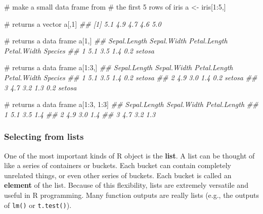 \documentclass[
  13,
  letterpaper,
]{report}
\newenvironment{Shaded}{\begin{snugshade}}{\end{snugshade}}
\newcommand{\CommentTok}[1]{\textcolor[rgb]{0.37,0.37,0.37}{#1}}
\newcommand{\DecValTok}[1]{\textcolor[rgb]{0.68,0.00,0.00}{#1}}
\newcommand{\DocumentationTok}[1]{\textcolor[rgb]{0.37,0.37,0.37}{\textit{#1}}}
\newcommand{\NormalTok}[1]{\textcolor[rgb]{0.00,0.23,0.31}{#1}}
\newcommand{\OtherTok}[1]{\textcolor[rgb]{0.00,0.23,0.31}{#1}}
\newcommand{\SpecialCharTok}[1]{\textcolor[rgb]{0.37,0.37,0.37}{#1}}
\begin{document}
\begin{Shaded}
\begin{Highlighting}[]
\CommentTok{\# make a small data frame from}
\CommentTok{\# the first 5 rows of iris}
\NormalTok{a }\OtherTok{\textless{}{-}}\NormalTok{ iris[}\DecValTok{1}\SpecialCharTok{:}\DecValTok{5}\NormalTok{,]}

\CommentTok{\# returns a vector}
\NormalTok{a[,}\DecValTok{1}\NormalTok{]}
\DocumentationTok{\#\# [1] 5.1 4.9 4.7 4.6 5.0}

\CommentTok{\# returns a data frame}
\NormalTok{a[}\DecValTok{1}\NormalTok{,]}
\DocumentationTok{\#\#   Sepal.Length Sepal.Width Petal.Length Petal.Width Species}
\DocumentationTok{\#\# 1          5.1         3.5          1.4         0.2  setosa}

\CommentTok{\# returns a data frame}
\NormalTok{a[}\DecValTok{1}\SpecialCharTok{:}\DecValTok{3}\NormalTok{,]}
\DocumentationTok{\#\#   Sepal.Length Sepal.Width Petal.Length Petal.Width Species}
\DocumentationTok{\#\# 1          5.1         3.5          1.4         0.2  setosa}
\DocumentationTok{\#\# 2          4.9         3.0          1.4         0.2  setosa}
\DocumentationTok{\#\# 3          4.7         3.2          1.3         0.2  setosa}

\CommentTok{\# returns a data frame}
\NormalTok{a[}\DecValTok{1}\SpecialCharTok{:}\DecValTok{3}\NormalTok{, }\DecValTok{1}\SpecialCharTok{:}\DecValTok{3}\NormalTok{]}
\DocumentationTok{\#\#   Sepal.Length Sepal.Width Petal.Length}
\DocumentationTok{\#\# 1          5.1         3.5          1.4}
\DocumentationTok{\#\# 2          4.9         3.0          1.4}
\DocumentationTok{\#\# 3          4.7         3.2          1.3}
\end{Highlighting}
\end{Shaded}

\subsubsection{Selecting from lists}\label{sec-05-select-bas-list}

One of the most important kinds of R object is the \textbf{list}. A list
can be thought of like a series of containers or buckets. Each bucket
can contain completely unrelated things, or even other series of
buckets. Each bucket is called an \textbf{element} of the list. Because
of this flexibility, lists are extremely versatile and useful in R
programming. Many function outputs are really lists (e.g., the outputs
of \texttt{lm()} or \texttt{t.test()}).
\end{document}
